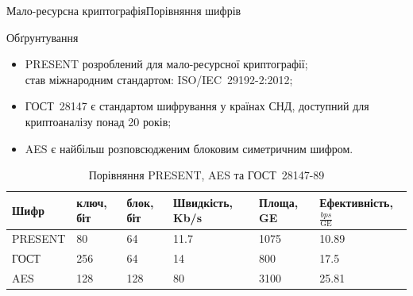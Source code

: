 \documentclass[10pt, ucs, handout]{beamer}
\begin{document}
\begin{frame}{Мало-ресурсна криптографія}{Порівняння шифрів}
    \begin{block}{Обґрунтування}
        \begin{itemize}
            \item PRESENT розроблений для мало-ресурсної криптографії; \\
                став міжнародним стандартом: ISO/IEC~29192-2:2012;
            \item ГОСТ~28147 є стандартом шифрування у країнах СНД,
                доступний для криптоаналізу понад 20 років;
            \item AES є найбільш розповсюдженим блоковим симетричним шифром.
        \end{itemize}
    \end{block}
    \begin{table}[htbp]
        \centering
        \caption{Порівняння PRESENT, AES та ГОСТ~28147-89}
        \label{tbl:comparison}
        \begin{tabular}{|l|p{1cm}|p{1cm}|p{2cm}|p{1.2cm}|p{2cm}|}
            \hline
            Шифр  & ключ, біт & блок, біт & Швидкість, Kb/s & Площа, GE & Ефективність, $\frac{bps}{\text{GE}}$ \\
            \hline
            PRESENT & 80  & 64  & 11.7 & 1075 & 10.89 \\
            \hline
            ГОСТ    & 256 & 64  & 14   & 800  & 17.5  \\
            \hline
            AES     & 128 & 128 & 80   & 3100 & 25.81 \\
            \hline
        \end{tabular}
    \end{table}
\end{frame}
\end{document}
